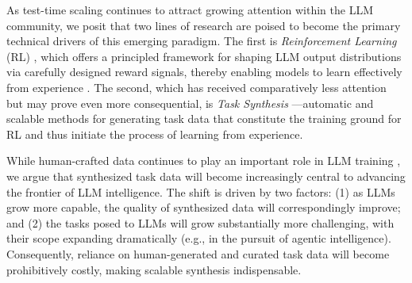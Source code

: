   
  As test-time scaling continues to attract growing attention within the LLM community, we posit that two lines of research are poised to become the primary technical drivers of this emerging paradigm. The first is \textit{Reinforcement Learning} (RL) \citep{guo2025deepseekr1,schulman2017proximal}, which offers a principled framework for shaping LLM output distributions via carefully designed reward signals, thereby enabling models to learn effectively from experience \citep{silver2025welcome}. The second, which has received comparatively less attention but may prove even more consequential, is \textit{Task Synthesis} \citep{yang2025swe,li2025websailor,zhao2025promptcot,liu2025webexplorer}—automatic and scalable methods for generating task data that constitute the training ground for RL and thus initiate the process of learning from experience.
  
  \newpage
  While human-crafted data continues to play an important role in LLM training \citep{moshkov2025aimo,ahmad2025opencodereasoning}, we argue that synthesized task data will become increasingly central to advancing the frontier of LLM intelligence. The shift is driven by two factors: (1) as LLMs grow more capable, the quality of synthesized data will correspondingly improve; and (2) the tasks posed to LLMs will grow substantially more challenging, with their scope expanding dramatically (e.g., in the pursuit of agentic intelligence). Consequently, reliance on human-generated and curated task data will become prohibitively costly, making scalable synthesis indispensable.
  
